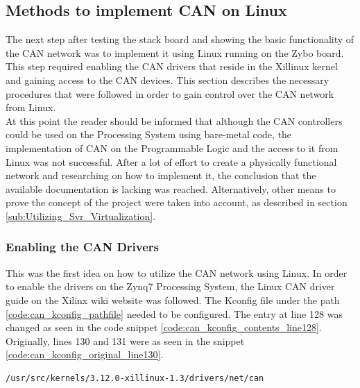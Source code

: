 \subsection{Methods to implement CAN on Linux}

The next step after testing the stack board and showing the basic functionality of the CAN network was to implement it using Linux running on the Zybo board.
This step required enabling the CAN drivers that reside in the Xillinux kernel and gaining access to the CAN devices.
This section describes the necessary procedures that were followed in order to gain control over the CAN network from Linux.
\\
At this point the reader should be informed that although the CAN controllers could be used on the Processing System using bare-metal code, the implementation of CAN on the Programmable Logic and the access to it from Linux was not successful.
After a lot of effort to create a physically functional network and researching on how to implement it, the conclusion that the available documentation is lacking was reached.
Alternatively, other means to prove the concept of the project were taken into account, as described in section \ref{sub:Utilizing_Svr_Virtualization}.

\subsubsection{Enabling the CAN Drivers}

This was the first idea on how to utilize the CAN network using Linux.
In order to enable the drivers on the Zynq7 Processing System, the Linux CAN driver guide \cite{Xilinx_wiki_Linux_CAN_driver} on the Xilinx wiki website \cite{Xilinx_wiki} was followed.
The Kconfig file under the path \ref{code:can_kconfig_pathfile} needed to be configured.
The entry at line 128 was changed as seen in the code snippet \ref{code:can_kconfig_contents_line128}.
Originally, lines 130 and 131 were as seen in the snippet \ref{code:can_kconfig_original_line130}.

\begin{lstlisting}[caption={CAN Kconfig pathfile.},numbers=none,label=code:can_kconfig_pathfile]
/usr/src/kernels/3.12.0-xillinux-1.3/drivers/net/can
\end{lstlisting}



